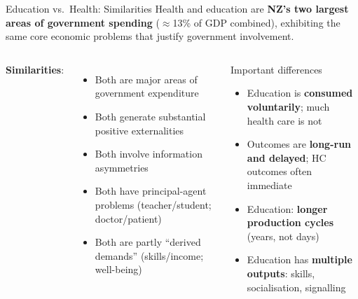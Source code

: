 \documentclass[aspectratio=169, 12pt]{beamer}
\begin{document}
\begin{frame}{Education vs.\ Health: Similarities}
  \footnotesize
  Health and education are \textbf{NZ's two largest areas of government spending} ($\approx$13\% of GDP combined), exhibiting the same core economic problems that justify government involvement.
  \vspace{0.1em}
  \begin{columns}
      \textbf{Similarities}:
      \begin{itemize}
        \item Both are major areas of government expenditure
        \item Both generate substantial positive externalities
        \item Both involve information asymmetries
        \item Both have principal-agent problems (teacher/student; doctor/patient)
        \item Both are partly ``derived demands'' (skills/income; well-being)
      \end{itemize}
      \begin{alertblock}{Important differences}
        \footnotesize
        \begin{itemize}
          \item Education is \textbf{consumed voluntarily}; much health care is not
          \item Outcomes are \textbf{long-run and delayed}; HC outcomes often immediate
          \item Education: \textbf{longer production cycles} (years, not days)
          \item Education has \textbf{multiple outputs}: skills, socialisation, signalling
        \end{itemize}
      \end{alertblock}
  \end{columns}
\end{frame}
\end{document}
